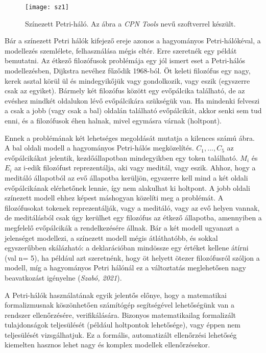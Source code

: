 \documentclass[12pt]{article}
\begin{document}
\begin{figure}
\texttt{[image: sz1]}
\caption{Színezett Petri-háló.  Az ábra a \textit{CPN Tools} nevű szoftverrel készült.}
\end{figure}


Bár a színezett Petri hálók kifejező ereje azonos a hagyományos Petri-hálókéval, a modellezés szemlélete, felhasználása mégis eltér. Erre szeretnék egy példát bemutatni. Az étkező filozófusok problémája egy jól ismert eset a Petri-hálós modellezésben, Dijkstra nevéhez fűződik 1968-ból. Öt keleti filozófus egy nagy, kerek asztal körül ül és mindegyikőjük vagy gondolkozik, vagy eszik (egyszerre csak az egyiket). Bármely két filozófus között egy evőpálcika található, de az evéshez mindkét oldalukon lévő evőpálcikára szükségük van. Ha mindenki felveszi a csak a jobb (vagy csak a bal) oldalán található evőpálcikát, akkor senki sem tud enni, és a filozófusok éhen halnak, mivel egymásra várnak (holtpont).

Ennek a problémának két lehetséges megoldását mutatja a kilences számú ábra. A bal oldali modell a hagyományos Petri-hálós megközelítés. $C_1, ..., C_5$ az evőpálcikákat jelentik, kezdőállapotban mindegyikben egy token található. $M_i$ és $E_i$ az i-edik filozófust reprezentálja, aki vagy meditál, vagy eszik. Ahhoz, hogy a meditáló állapotból az evő állapotba kerüljön, egyszerre kell mind a két oldali evőpálcikának elérhetőnek lennie, így nem alakulhat ki holtpont.
A jobb oldali színezett modell ehhez képest máshogyan közelíti meg a problémát. A filozófusokat tokenek reprezentálják, vagy a meditáló, vagy az evő helyen vannak, de meditálásból csak úgy kerülhet egy filozófus az étkező állapotba, amennyiben a megfelelő evőpálcikák a rendelkezésére állnak.
Bár a két modell ugyanazt a jelenséget modellezi, a színezett modell mégis átláthatóbb, és sokkal egyszerűbben skálázható: a deklarációban mindössze egy értéket kellene átírni (val n= 5), ha például azt szeretnénk, hogy öt helyett ötezer filozófusról szóljon a modell, míg a hagyományos Petri hálónál ez a változtatás meglehetősen nagy beavatkozást igényelne (\textit{Szabó, 2021}).

A Petri-hálók használatának egyik jelentős előnye, hogy a matematikai formalizmusnak köszönhetően számítógép segítségével lehetőségünk van a rendszer ellenőrzésére, verifikálására. Bizonyos matematikailag formalizált tulajdonságok teljesülését (például holtpontok lehetősége), vagy éppen nem teljesülését vizsgálhatjuk. Ez a formális, automatizált ellenőrzési lehetőség kiemelten hasznos lehet nagy és komplex modellek ellenőrzésekor.
\end{document}
